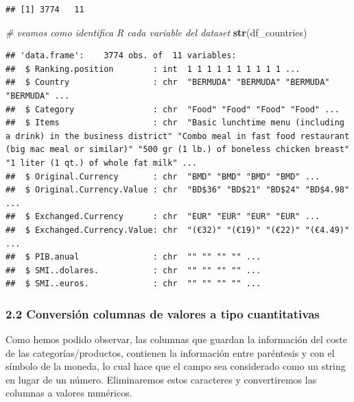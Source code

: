 \documentclass[
]{article}
\newenvironment{Shaded}{\begin{snugshade}}{\end{snugshade}}
\newcommand{\CommentTok}[1]{\textcolor[rgb]{0.56,0.35,0.01}{\textit{#1}}}
\newcommand{\FunctionTok}[1]{\textcolor[rgb]{0.13,0.29,0.53}{\textbf{#1}}}
\newcommand{\NormalTok}[1]{#1}
\begin{document}
\begin{verbatim}
## [1] 3774   11
\end{verbatim}

\begin{Shaded}
\begin{Highlighting}[]
\CommentTok{\# veamos como identifica R cada variable del dataset}
\FunctionTok{str}\NormalTok{(df\_countries)}
\end{Highlighting}
\end{Shaded}

\begin{verbatim}
## 'data.frame':    3774 obs. of  11 variables:
##  $ Ranking.position        : int  1 1 1 1 1 1 1 1 1 1 ...
##  $ Country                 : chr  "BERMUDA" "BERMUDA" "BERMUDA" "BERMUDA" ...
##  $ Category                : chr  "Food" "Food" "Food" "Food" ...
##  $ Items                   : chr  "Basic lunchtime menu (including a drink) in the business district" "Combo meal in fast food restaurant (big mac meal or similar)" "500 gr (1 lb.) of boneless chicken breast" "1 liter (1 qt.) of whole fat milk" ...
##  $ Original.Currency       : chr  "BMD" "BMD" "BMD" "BMD" ...
##  $ Original.Currency.Value : chr  "BD$36" "BD$21" "BD$24" "BD$4.98" ...
##  $ Exchanged.Currency      : chr  "EUR" "EUR" "EUR" "EUR" ...
##  $ Exchanged.Currency.Value: chr  "(€32)" "(€19)" "(€22)" "(€4.49)" ...
##  $ PIB.anual               : chr  "" "" "" "" ...
##  $ SMI..dolares.           : chr  "" "" "" "" ...
##  $ SMI..euros.             : chr  "" "" "" "" ...
\end{verbatim}

\hypertarget{conversiuxf3n-columnas-de-valores-a-tipo-cuantitativas}{%
\subsubsection{2.2 Conversión columnas de valores a tipo
cuantitativas}\label{conversiuxf3n-columnas-de-valores-a-tipo-cuantitativas}}

Como hemos podido observar, las columnas que guardan la información del
coste de las categorías/productos, contienen la información entre
paréntesis y con el símbolo de la moneda, lo cual hace que el campo sea
considerado como un string en lugar de un número. Eliminaremos estos
caracteres y convertiremos las columnas a valores numéricos.
\end{document}
